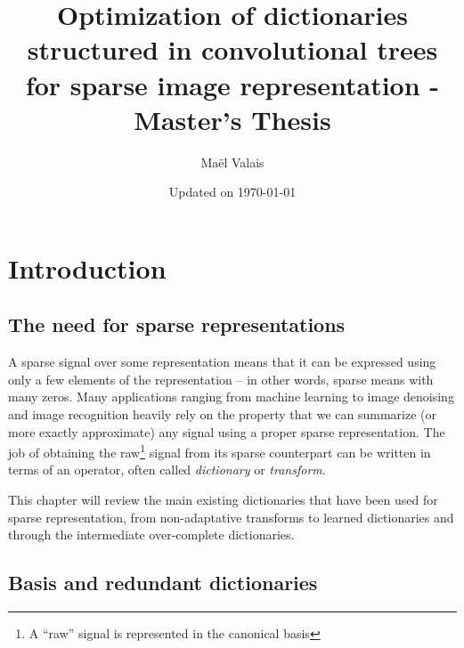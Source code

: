 \author{Maël Valais}
\date{Updated on \today}
\title{Optimization of dictionaries structured in convolutional trees for sparse image representation - Master’s Thesis}

\pagestyle{empty} \restoregeometry
\pagestyle{body}
\tableofcontents



\chapter{Introduction} %

\section{The need for sparse representations}

A sparse signal over some representation means that it can be expressed using only a few elements of the representation – in other words, sparse means with many zeros. Many applications ranging from machine learning to image denoising and image recognition heavily rely on the property that we can summarize (or more exactly approximate) any signal using a proper sparse representation. The job of obtaining the raw\footnote{A “raw” signal is represented in the canonical basis} signal from its sparse counterpart can be written in terms of an operator, often called \emph{dictionary} or \emph{transform}.

This chapter will review the main existing dictionaries that have been used for sparse representation, from non-adaptative transforms to learned dictionaries and through the intermediate over-complete dictionaries.

\section{Basis and redundant dictionaries}

